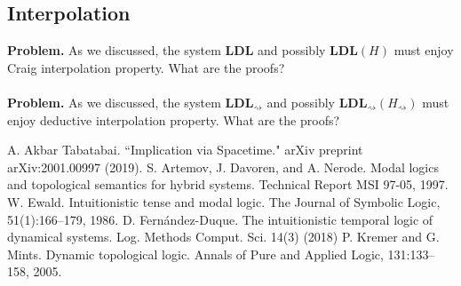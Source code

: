 \documentclass[12pt,a4paper]{article}
\theoremstyle{plain}
\theoremstyle{definition}
\begin{document}
\subsection{Interpolation}
\textbf{Problem.} As we discussed, the system $\mathbf{LDL}$ and possibly $\mathbf{LDL}(H)$ must enjoy Craig interpolation property. What are the proofs?\\
\\
\textbf{Problem.} As we discussed, the system $\mathbf{LDL}_{\rightsquigarrow}$ and possibly $\mathbf{LDL}_{\rightsquigarrow}(H_{\rightsquigarrow})$ must enjoy deductive interpolation property. What are the proofs?

\begin{thebibliography}{99}

A. Akbar Tabatabai. ``Implication via Spacetime." arXiv preprint arXiv:2001.00997 (2019).
S. Artemov, J. Davoren, and A. Nerode. Modal logics and topological semantics for hybrid systems. Technical Report MSI 97-05, 1997.
W. Ewald. Intuitionistic tense and modal logic. The Journal of Symbolic Logic, 51(1):166–179, 1986.
D. Fernández-Duque. The intuitionistic temporal logic of dynamical systems. Log. Methods Comput. Sci. 14(3) (2018)
P. Kremer and G. Mints. Dynamic topological logic. Annals of Pure and Applied Logic, 131:133–158, 2005.

\end{thebibliography}
\end{document}
